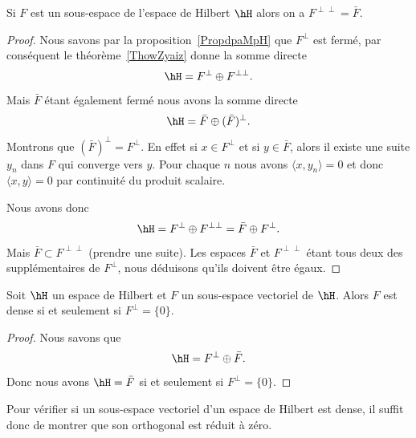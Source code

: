 \begin{proposition}
	Si \( F\) est un sous-espace de l'espace de Hilbert \( \hH\) alors on a \( F^{\perp\perp}=\bar F\).
\end{proposition}

\begin{proof}
	Nous savons par la proposition~\ref{PropdpaMpH} que \( F^{\perp}\) est fermé, par conséquent le théorème~\ref{ThowZyaiz} donne la somme directe
	\begin{equation}
		\hH=F^{\perp}\oplus F^{\perp\perp}.
	\end{equation}
	Mais \( \bar F\) étant également fermé nous avons la somme directe
	\begin{equation}
		\hH=\bar F\oplus(\bar F)^{\perp}.
	\end{equation}
	Montrons que \( (\bar F)^{\perp}=F^{\perp}\). En effet si \( x\in F^{\perp}\) et si \( y\in \bar F\), alors il existe une suite \( y_n\) dans \( F\) qui converge vers \( y\). Pour chaque \( n\) nous avons \( \langle x, y_n\rangle =0\) et donc \( \langle x, y\rangle =0\) par continuité du produit scalaire.

	Nous avons donc
	\begin{equation}
		\hH=F^{\perp}\oplus F^{\perp\perp}=\bar F\oplus F^{\perp}.
	\end{equation}
	Mais \( \bar F\subset F^{\perp\perp}\) (prendre une suite). Les espaces \( \bar F\) et \( F^{\perp\perp}\) étant tous deux des supplémentaires de \( F^{\perp}\), nous déduisons qu'ils doivent être égaux.
\end{proof}

\begin{proposition}     \label{PropqiWonByiBmc}
	Soit \( \hH\) un espace de Hilbert et \( F\) un sous-espace vectoriel de \( \hH\). Alors \( F\) est dense si et seulement si \( F^{\perp}=\{ 0 \}\).
\end{proposition}

\begin{proof}
	Nous savons que
	\begin{equation}
		\hH=F^{\perp}\oplus \bar F.
	\end{equation}
	Donc nous avons \( \hH=\bar F\) si et seulement si \( F^{\perp}=\{ 0 \}\).
\end{proof}
Pour vérifier si un sous-espace vectoriel d'un espace de Hilbert est dense, il suffit donc de montrer que son orthogonal est réduit à zéro.

